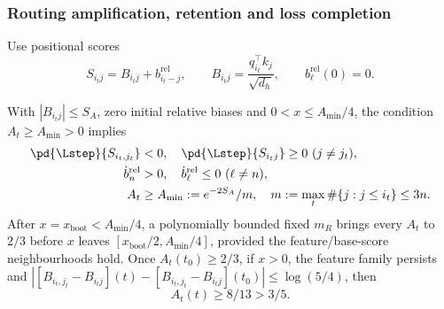 \subsubsection{Routing amplification, retention and loss completion}
\label{app:weak-routing-convergence}

Use positional scores
\begin{equation}\label{eq:lr-relative-scores}
 S_{i_tj}=B_{i_tj}+b_{i_t-j}^{\mathrm{rel}},
 \qquad
 B_{i_tj}=\frac{q_{i_t}^\top k_j}{\sqrt{d_h}},
 \qquad b_\ell^{\mathrm{rel}}(0)=0.
\end{equation}

\begin{lemma}
\label{lem:lr-bias-learning}\label{lem:lr-post-routing}
With $|B_{i_tj}|\le S_A$, zero initial relative biases and
$0<x\le A_{\min}/4$, the condition $A_t\ge A_{\min}>0$ implies
\begin{align}
 \pd{\Lstep}{S_{i_t,j_t}}&<0,\quad \pd{\Lstep}{S_{i_tj}}\ge0\ (j\ne j_t),
 \label{eq:lr-smallscore-sign}\\
 \dot b_n^{\mathrm{rel}}&>0,\quad \dot b_\ell^{\mathrm{rel}}\le0\ (\ell\ne n),
 \label{eq:lr-beta-routes}\\
 A_t&\ge A_{\min}:=e^{-2S_A}/m,\quad
 m:=\max_t\#\{j:j\le i_t\}\le3n.\label{eq:lr-floor}
\end{align}
After $x=x_{\mathrm{boot}}<A_{\min}/4$, a polynomially bounded fixed $m_R$
brings every $A_t$ to $2/3$ before $x$ leaves
$[x_{\mathrm{boot}}/2,A_{\min}/4]$, provided the feature/base-score
neighbourhoods hold. Once $A_t(t_0)\ge2/3$, if $x>0$, the feature family
persists and
$|[B_{i_t,j_t}-B_{i_tj}](t)-[B_{i_t,j_t}-B_{i_tj}](t_0)|\le\log(5/4)$,
then
\begin{equation}\label{eq:lr-post-floor}
 A_t(t)\ge8/13>3/5.
\end{equation}
\end{lemma}
